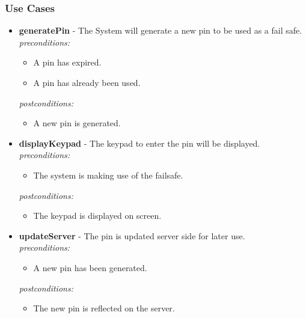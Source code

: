 \documentclass[a4paper,12pt]{article}
\begin{document}
	\newpage
	\subsubsection{Use Cases}
	
	\begin{itemize}
		\item \textbf{generatePin} - The System will generate a new pin to be used as a fail safe.\\[0.5cm]
		\textit{preconditions:}
		\begin{itemize}
			\item A pin has expired.
			\item A pin has already been used.
		\end{itemize}
		
		\textit{postconditions:}
		\begin{itemize}
			\item A new pin is generated.\\[0.5cm]
		\end{itemize}
		
		\item \textbf{displayKeypad} -  The keypad to enter the pin will be displayed.\\[0.5cm]
		\textit{preconditions:}
		\begin{itemize}
			\item The system is making use of the failsafe.
		\end{itemize}
		
		\textit{postconditions:}
		\begin{itemize}
			\item The keypad is displayed on screen.\\[0.5cm]
		\end{itemize}
		
		\item \textbf{updateServer} -  The pin is updated server side for later use.\\[0.5cm]
		\textit{preconditions:}
		\begin{itemize}
			\item A new pin has been generated.
		\end{itemize}
		
		\textit{postconditions:}
		\begin{itemize}
			\item The new pin is reflected on the server.\\[0.5cm]
		\end{itemize}
		

\end{itemize}
\end{document}
